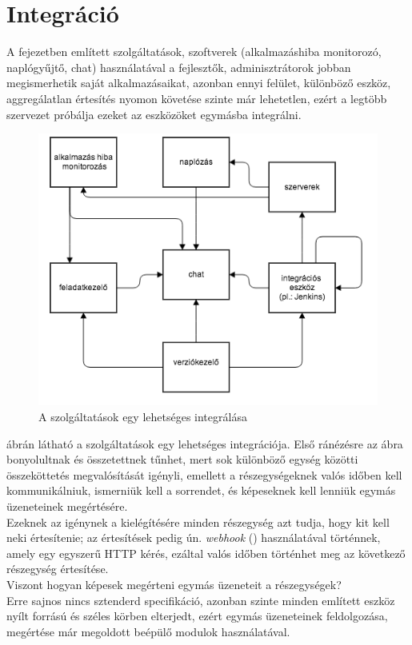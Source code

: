 \section{Integráció\\}
\label{section:service_integration}
A fejezetben említett szolgáltatások, szoftverek (alkalmazáshiba monitorozó, naplógyűjtő, chat) használatával a fejlesztők, adminisztrátorok jobban megismerhetik saját alkalmazásaikat, azonban ennyi felület, különböző eszköz, aggregálatlan értesítés nyomon követése szinte már lehetetlen, ezért a legtöbb szervezet próbálja ezeket az eszközöket egymásba integrálni.
\begin{figure}[ht]
	\centering
		\includegraphics[scale=1.0]{assets/integrated_services.png}%
		\caption[DUMMY]%
		{A szolgáltatások egy lehetséges integrálása}%
		\label{fig:integrated-services}
\end{figure}
 ábrán látható a szolgáltatások egy lehetséges integrációja. Első ránézésre az ábra bonyolultnak és összetettnek tűnhet, mert sok különböző egység közötti összeköttetés megvalósítását igényli, emellett a részegységeknek valós időben kell kommunikálniuk, ismerniük kell a sorrendet, és képeseknek kell lenniük egymás üzeneteinek megértésére.\\
Ezeknek az igénynek a kielégítésére minden részegység azt tudja, hogy kit kell neki értesítenie; az értesítések pedig ún. \emph{webhook} (\cite{web_hook}) használatával történnek, amely egy egyszerű HTTP kérés, ezáltal valós időben történhet meg az következő részegység értesítése.\\
Viszont hogyan képesek megérteni egymás üzeneteit a részegységek?\\
Erre sajnos nincs sztenderd specifikáció, azonban szinte minden említett eszköz nyílt forrású és széles körben elterjedt, ezért egymás üzeneteinek feldolgozása, megértése már megoldott beépülő modulok használatával.\\

